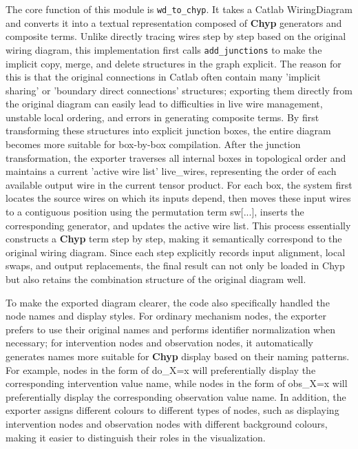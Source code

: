 \documentclass[a4paper]{report}
\begin{document}
The core function of this module is \texttt{wd\_to\_chyp}. It takes a Catlab WiringDiagram and converts it into a textual representation composed of \textbf{Chyp} generators and composite terms. Unlike directly tracing wires step by step based on the original wiring diagram, this implementation first calls \texttt{add\_junctions} to make the implicit copy, merge, and delete structures in the graph explicit. The reason for this is that the original connections in Catlab often contain many 'implicit sharing' or 'boundary direct connections' structures; exporting them directly from the original diagram can easily lead to difficulties in live wire management, unstable local ordering, and errors in generating composite terms. By first transforming these structures into explicit junction boxes, the entire diagram becomes more suitable for box-by-box compilation. After the junction transformation, the exporter traverses all internal boxes in topological order and maintains a current 'active wire list' live\_wires, representing the order of each available output wire in the current tensor product. For each box, the system first locates the source wires on which its inputs depend, then moves these input wires to a contiguous position using the permutation term sw[...], inserts the corresponding generator, and updates the active wire list. This process essentially constructs a \textbf{Chyp} term step by step, making it semantically correspond to the original wiring diagram. Since each step explicitly records input alignment, local swaps, and output replacements, the final result can not only be loaded in Chyp but also retains the combination structure of the original diagram well.

To make the exported diagram clearer, the code also specifically handled the node names and display styles. For ordinary mechanism nodes, the exporter prefers to use their original names and performs identifier normalization when necessary; for intervention nodes and observation nodes, it automatically generates names more suitable for \textbf{Chyp} display based on their naming patterns. For example, nodes in the form of do\_X=x will preferentially display the corresponding intervention value name, while nodes in the form of obs\_X=x will preferentially display the corresponding observation value name. In addition, the exporter assigns different colours to different types of nodes, such as displaying intervention nodes and observation nodes with different background colours, making it easier to distinguish their roles in the visualization.
\end{document}
